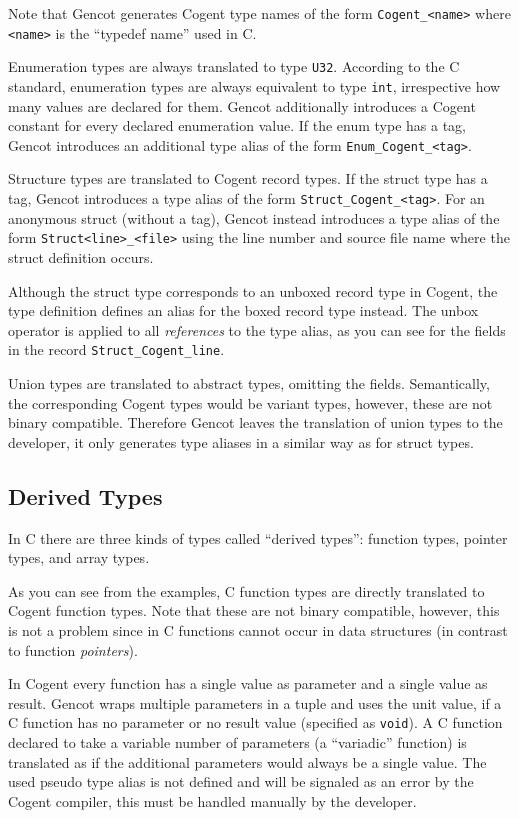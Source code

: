 \documentclass[a4paper]{report}
\newcommand{\code}[1]{\textnormal{\texttt{#1}}}
\begin{document}
Note that Gencot generates Cogent type names of the form \code{Cogent\_<name>} where \code{<name>} is the ``typedef
name'' used in C. 

Enumeration types are always translated to type \code{U32}. According to the C standard, enumeration types are always
equivalent to type \code{int}, irrespective how many values are declared for them. Gencot additionally introduces
a Cogent constant for every declared enumeration value. If the enum type has a tag, Gencot introduces an additional
type alias of the form \code{Enum\_Cogent\_<tag>}.

Structure types are translated to Cogent record types. If the struct type has a tag, Gencot introduces a type alias
of the form \code{Struct\_Cogent\_<tag>}. For an anonymous struct (without a tag), Gencot instead introduces a type alias
of the form \code{Struct<line>\_<file>} using the line number and source file name where the struct definition occurs.

Although the struct type corresponds to an unboxed record type in Cogent, the type definition defines an alias for the 
boxed record type instead. The unbox operator is applied to all \textit{references} to the type alias, as you can see 
for the fields in the record \code{Struct\_Cogent\_line}.

Union types are translated to abstract types, omitting the fields. Semantically, the corresponding Cogent types would
be variant types, however, these are not binary compatible. Therefore Gencot leaves the translation of union types to
the developer, it only generates type aliases in a similar way as for struct types.

\subsection{Derived Types}
\label{types-auto-derived}

In C there are three kinds of types called ``derived types'': function types, pointer types, and array types.

As you can see from the examples, C function types are directly translated to Cogent function types. Note that these
are not binary compatible, however, this is not a problem since in C functions cannot occur in data structures (in
contrast to function \textit{pointers}).

In Cogent every function has a single value as parameter and a single value as result. Gencot wraps multiple parameters
in a tuple and uses the unit value, if a C function has no parameter or no result value (specified as \code{void}).
A C function declared to take a variable number of parameters (a ``variadic'' function) is translated as if the 
additional parameters would always be a single value. The used pseudo type alias is not defined and will be signaled
as an error by the Cogent compiler, this must be handled manually by the developer.
\end{document}
